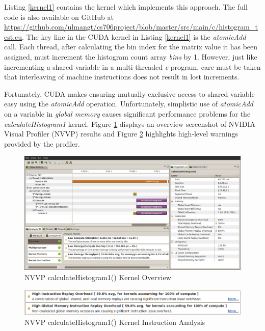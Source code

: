 \documentclass{article}
\begin{document}
Listing \ref{kernel1} contains the kernel which implements this approach. The full code is also available on GitHub at \url{https://github.com/ulmangt/cs706project/blob/master/src/main/c/histogram_test.cu}. The key line in the CUDA kernel in Listing \ref{kernel1} is the \emph{atomicAdd} call. Each thread, after calculating the bin index for the matrix value it has been assigned, must increment the histogram count array \emph{bins} by 1. However, just like incrementing a shared variable in a multi-threaded \emph{c} program, care must be taken that interleaving of machine instructions does not result in lost increments.

Fortunately, CUDA makes ensuring mutually exclusive access to shared variable easy using the \emph{atomicAdd} operation\cite{arithmetic-functions}. Unfortunately, simplistic use of \emph{atomicAdd} on a variable in \emph{global memory} causes significant performance problems for the \emph{calculateHistogram1} kernel. Figure \ref{kernel1nvvp1} displays an overview screenshot of NVIDIA Visual Profiler (NVVP) results and Figure \ref{kernel1nvvp2} highlights high-level warnings provided by the profiler.

\begin{figure}
\centering
\includegraphics[width=1.0\textwidth]{screenshots/nvvp/calculateHistogram1_screen1.png}
\caption{NVVP calculateHistogram1() Kernel Overview }
\label{kernel1nvvp1}
\end{figure}

\begin{figure}
\centering
\includegraphics[width=1.0\textwidth]{screenshots/nvvp/calculateHistogram1_screen2.png}
\caption{NVVP calculateHistogram1() Kernel Instruction Analysis}
\label{kernel1nvvp2}
\end{figure}
\end{document}
